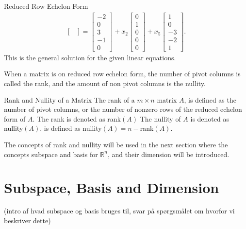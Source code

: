 \begin{example}{Reduced Row Echelon Form}
\begin{align*}
\begin{bmatrix}
        \end{bmatrix}=
        \begin{bmatrix}
      	    -2\\ 0 \\ 3 \\-1 \\0
        \end{bmatrix} + x_2
        \begin{bmatrix}
            0 \\ 1 \\ 0 \\ 0 \\ 0 
        \end{bmatrix} + x_5
        \begin{bmatrix}
            1 \\ 0 \\ -3 \\ -2 \\ 1
        \end{bmatrix}.
    \end{align*}
This is the general solution for the given linear equations.
\end{example}
When a matrix is on reduced row echelon form, the number of pivot columns is called the rank, and the amount of non pivot columns is the nullity.
\begin{definition}{Rank and Nullity of a Matrix}\label{def:rank_nullity}
The rank of a $m \times n$ matrix $A$, is defined as the number of pivot columns, or the number of nonzero rows of the reduced echelon form of $A$. The rank is denoted as rank$(A)$
The nullity of $A$ is denoted as nullity$(A)$, is defined as nullity$(A)=n - $rank$(A)$.
\cite[47]{LiAl}
\end{definition}
The concepts of rank and nullity will be used in the next section where the concepts subspace and basis for $\mathbb{R}^n$, and their dimension will be introduced.
\section{Subspace, Basis and Dimension}
(intro af hvad subspace og basis bruges til, svar på spørgsmålet om hvorfor vi beskriver dette)

